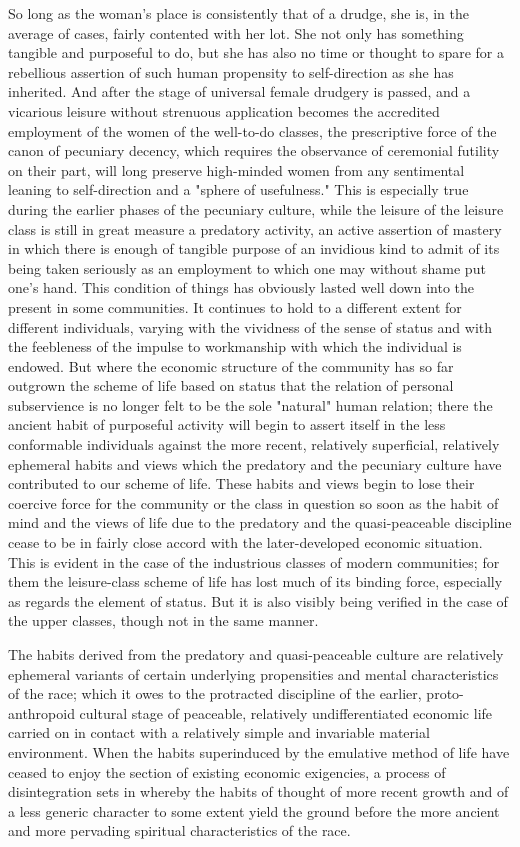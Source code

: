 \documentclass[12pt]{report}
\begin{document}
So long as the woman's place is consistently that of a drudge, she is,
in the average of cases, fairly contented with her lot. She not only
has something tangible and purposeful to do, but she has also no time or
thought to spare for a rebellious assertion of such human propensity to
self-direction as she has inherited. And after the stage of universal
female drudgery is passed, and a vicarious leisure without strenuous
application becomes the accredited employment of the women of the
well-to-do classes, the prescriptive force of the canon of pecuniary
decency, which requires the observance of ceremonial futility on their
part, will long preserve high-minded women from any sentimental leaning
to self-direction and a "sphere of usefulness." This is especially true
during the earlier phases of the pecuniary culture, while the leisure
of the leisure class is still in great measure a predatory activity, an
active assertion of mastery in which there is enough of tangible
purpose of an invidious kind to admit of its being taken seriously as an
employment to which one may without shame put one's hand. This condition
of things has obviously lasted well down into the present in some
communities. It continues to hold to a different extent for different
individuals, varying with the vividness of the sense of status and with
the feebleness of the impulse to workmanship with which the individual
is endowed. But where the economic structure of the community has so
far outgrown the scheme of life based on status that the relation of
personal subservience is no longer felt to be the sole "natural" human
relation; there the ancient habit of purposeful activity will begin
to assert itself in the less conformable individuals against the more
recent, relatively superficial, relatively ephemeral habits and views
which the predatory and the pecuniary culture have contributed to our
scheme of life. These habits and views begin to lose their coercive
force for the community or the class in question so soon as the habit of
mind and the views of life due to the predatory and the quasi-peaceable
discipline cease to be in fairly close accord with the later-developed
economic situation. This is evident in the case of the industrious
classes of modern communities; for them the leisure-class scheme of life
has lost much of its binding force, especially as regards the element of
status. But it is also visibly being verified in the case of the upper
classes, though not in the same manner.

The habits derived from the predatory and quasi-peaceable culture are
relatively ephemeral variants of certain underlying propensities and
mental characteristics of the race; which it owes to the protracted
discipline of the earlier, proto-anthropoid cultural stage of peaceable,
relatively undifferentiated economic life carried on in contact with a
relatively simple and invariable material environment. When the habits
superinduced by the emulative method of life have ceased to enjoy the
section of existing economic exigencies, a process of disintegration
sets in whereby the habits of thought of more recent growth and of a
less generic character to some extent yield the ground before the more
ancient and more pervading spiritual characteristics of the race.
\end{document}
